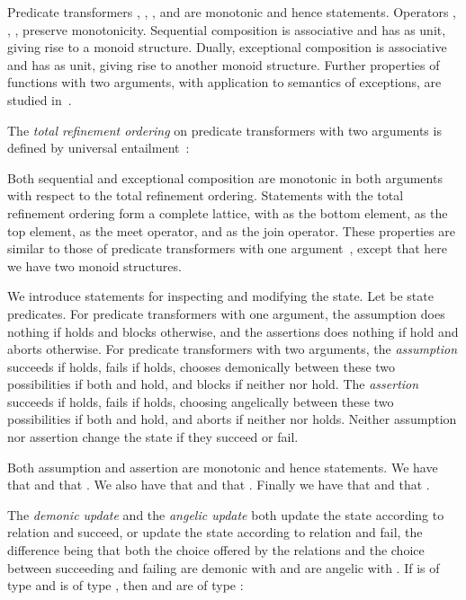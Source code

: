 \documentclass[submission,copyright,creativecommons]{eptcs}
\begin{document}
Predicate transformers , , , and  are monotonic and hence statements. Operators , , ,  preserve monotonicity. Sequential composition is associative and has  as unit, giving rise to a monoid structure. Dually, exceptional composition is associative and has  as unit, giving rise to another monoid structure. Further properties of functions with two arguments, with application to semantics of exceptions, are studied in~\cite{LeinoSnepscheut94SemanticsExceptions, ManoharLeino95ConditionalComposition}.

The {\em total refinement ordering}  on predicate transformers with two arguments is defined by universal entailment~\cite{KingMorgan95ExitsInRefinementCalculus}:

Both sequential and exceptional composition are monotonic in both arguments with respect to the total refinement ordering. Statements with the total refinement ordering form a complete lattice, with  as the bottom element,  as the top element,  as the meet operator, and  as the join operator. These properties are similar to those of predicate transformers with one argument~\cite{BackVonWright98RefinementCalculus}, except that here we have two monoid structures.

We introduce statements for inspecting and modifying the state. Let  be state predicates. For predicate transformers with one argument, the assumption   does nothing if  holds and blocks otherwise, and the assertions  does nothing if  hold and aborts otherwise. For predicate transformers with two arguments, the {\em assumption}  succeeds if  holds, fails if  holds, chooses demonically between these two possibilities if both  and  hold, and blocks if neither  nor  hold. The {\em assertion}  succeeds if  holds, fails if  holds, choosing angelically between these two possibilities if both  and  hold, and aborts if neither  nor  holds. Neither assumption nor assertion change the state if they succeed or fail.

Both assumption and assertion are monotonic and hence statements. We have that  and that . We also have that  and that . Finally we have that  and that .

The {\em demonic update}  and the {\em angelic update}  both update the state according to relation  and succeed, or update the state according to relation  and fail, the difference being that both the choice offered by the relations and the choice between succeeding and failing are demonic with  and are angelic with . If  is of type  and  is of type , then  and  are of type :
\end{document}
